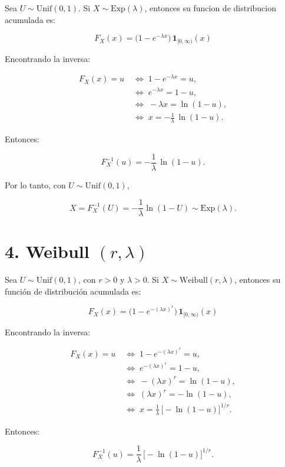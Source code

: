 \documentclass[10pt,a4paper]{article}
\begin{document}
    Sea \textbf{\(U\sim\mathrm{Unif}(0,1)\)}. Si
\(X\sim\mathrm{Exp}(\lambda)\), entonces su funcion de distribucion
acumulada es:

\[
F_X(x)=\bigl(1-e^{-\lambda x}\bigr)\,\mathbf{1}_{[0,\infty)}(x)
\]

Encontrando la inversa:

\[
\begin{aligned}
F_X(x)=u &\;\iff\; 1-e^{-\lambda x}=u,\\
         &\;\iff\; e^{-\lambda x}=1-u,\\
         &\;\iff\; -\lambda x=\ln(1-u),\\
         &\;\iff\; x=-\frac{1}{\lambda}\,\ln(1-u).
\end{aligned}
\]

Entonces:

\[
F_X^{-1}(u)=-\frac{1}{\lambda}\,\ln(1-u).
\]

Por lo tanto, con \(U\sim\mathrm{Unif}(0,1)\),

\[
X=F_X^{-1}(U)=-\frac{1}{\lambda}\ln(1-U)\sim\mathrm{Exp}(\lambda).
\]

    \hypertarget{weibull-rlambda}{%
\section{\texorpdfstring{4. Weibull
\((r,\lambda)\)}{4. Weibull (r,\textbackslash lambda)}}\label{weibull-rlambda}}

    Sea \textbf{\(U\sim\mathrm{Unif}(0,1)\)}, con \(r>0\) y \(\lambda>0\).
Si \(X\sim\mathrm{Weibull}(r,\lambda)\), entonces su función de
distribución acumulada es:

\[
F_X(x)=\bigl(1-e^{-(\lambda x)^r}\bigr)\,\mathbf{1}_{[0,\infty)}(x)
\]

Encontrando la inversa:

\[
\begin{aligned}
F_X(x)=u &\;\iff\; 1-e^{-(\lambda x)^r}=u,\\
         &\;\iff\; e^{-(\lambda x)^r}=1-u,\\
         &\;\iff\; -(\lambda x)^r=\ln(1-u),\\
         &\;\iff\; (\lambda x)^r=-\ln(1-u),\\
         &\;\iff\; x=\frac{1}{\lambda}\,\bigl[-\ln(1-u)\bigr]^{1/r}.
\end{aligned}
\]

Entonces:

\[
F_X^{-1}(u)=\frac{1}{\lambda}\,\bigl[-\ln(1-u)\bigr]^{1/r}.
\]
\end{document}
